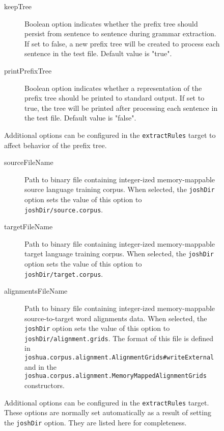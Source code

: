 \documentclass{pbml}
\begin{document}
\begin{figure}
\begin{description}
	\item[keepTree] Boolean option indicates whether the prefix tree should persist from sentence to sentence during grammar extraction. If set to false, a new prefix tree will be created to process each sentence in the test file. Default value is "true".

	\item[printPrefixTree] Boolean option indicates whether a representation of the prefix tree should be printed to standard output. If set to true, the tree will be printed after processing each sentence in the test file. Default value is "false".

\end{description}
\caption{Additional options can be configured in the {\tt extractRules} target to affect behavior of the prefix tree.}
\end{figure}



\begin{figure}
\begin{description}
	\item[sourceFileName] Path to binary file containing integer-ized memory-mappable source language training corpus. When selected, the {\tt joshDir} option sets the value of this option to {\tt joshDir/source.corpus}.

	\item[targetFileName] Path to binary file containing integer-ized memory-mappable target language training corpus. When selected, the {\tt joshDir} option sets the value of this option to {\tt joshDir/target.corpus}.

	\item[alignmentsFileName] Path to binary file containing integer-ized memory-mappable source-to-target word alignments data. When selected, the {\tt joshDir} option sets the value of this option to {\tt joshDir/alignment.grids}. The format of this file is defined in {\tt joshua.corpus.alignment.AlignmentGrids\#writeExternal} and in the {\tt joshua.corpus.alignment.MemoryMappedAlignmentGrids} constructors.
\end{description}
\caption{Additional options can be configured in the {\tt extractRules} target. These options are normally set automatically as a result of setting the {\tt joshDir} option. They are listed here for completeness.}
\end{figure}
\end{document}
